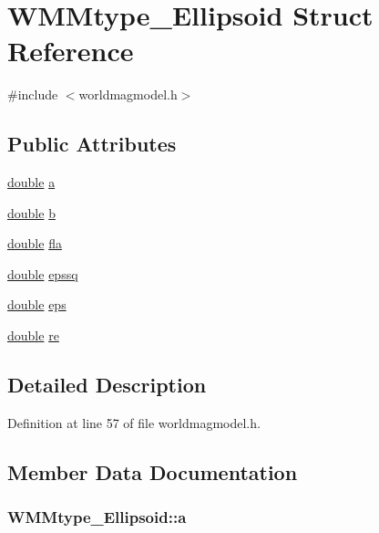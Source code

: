 \hypertarget{struct_w_m_mtype___ellipsoid}{\section{W\-M\-Mtype\-\_\-\-Ellipsoid Struct Reference}
\label{struct_w_m_mtype___ellipsoid}
}


{\ttfamily \#include $<$worldmagmodel.\-h$>$}

\subsection*{Public Attributes}
\begin{DoxyCompactItemize}
\item 
\hyperlink{_super_l_u_support_8h_a8956b2b9f49bf918deed98379d159ca7}{double} \hyperlink{struct_w_m_mtype___ellipsoid_add41097d897f17de01f4e22c4a765859}{a}
\item 
\hyperlink{_super_l_u_support_8h_a8956b2b9f49bf918deed98379d159ca7}{double} \hyperlink{struct_w_m_mtype___ellipsoid_a700f1bab0f80706ecc671bdbb000a0a6}{b}
\item 
\hyperlink{_super_l_u_support_8h_a8956b2b9f49bf918deed98379d159ca7}{double} \hyperlink{struct_w_m_mtype___ellipsoid_a001bda565c83d57cf057d66dcc6f92ea}{fla}
\item 
\hyperlink{_super_l_u_support_8h_a8956b2b9f49bf918deed98379d159ca7}{double} \hyperlink{struct_w_m_mtype___ellipsoid_ab21d8812b21bf6481a495af07bc746ee}{epssq}
\item 
\hyperlink{_super_l_u_support_8h_a8956b2b9f49bf918deed98379d159ca7}{double} \hyperlink{struct_w_m_mtype___ellipsoid_a294084e52ea367c0e1cd4ed78a7cb29d}{eps}
\item 
\hyperlink{_super_l_u_support_8h_a8956b2b9f49bf918deed98379d159ca7}{double} \hyperlink{struct_w_m_mtype___ellipsoid_aa051b086d02950addfe843925a79b3f9}{re}
\end{DoxyCompactItemize}


\subsection{Detailed Description}


Definition at line 57 of file worldmagmodel.\-h.



\subsection{Member Data Documentation}
\hypertarget{struct_w_m_mtype___ellipsoid_add41097d897f17de01f4e22c4a765859}{
\subsubsection[{a}]{ W\-M\-Mtype\-\_\-\-Ellipsoid\-::a}}\label{struct_w_m_mtype___ellipsoid_add41097d897f17de01f4e22c4a765859}


